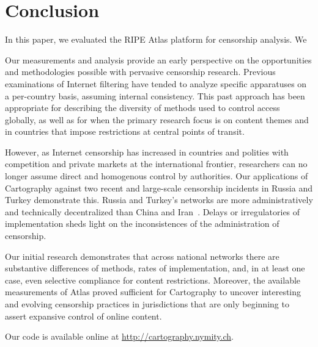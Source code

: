 \section{Conclusion}
\label{sec:conclusion}

In this paper, we evaluated the RIPE Atlas platform for censorship analysis.
We

Our measurements and analysis provide an early perspective on the opportunities
and methodologies possible with pervasive censorship research. Previous
examinations of Internet filtering have tended to analyze specific apparatuses
on a per-country basis, assuming internal consistency. This past approach has
been appropriate for describing the diversity of methods used to control access
globally, as well as for when the primary research focus is on content themes
and in countries that impose restrictions at central points of transit. 

However, as Internet censorship has increased in countries and polities with
competition and private markets at the international frontier, researchers can
no longer assume direct and homogenous control by authorities. Our applications
of Cartography against two recent and large-scale censorship incidents in
Russia and Turkey demonstrate this. Russia and Turkey's networks are more
administratively and technically decentralized than China and
Iran~\cite{Roberts2011}. Delays or irregulatories of implementation sheds light
on the inconsistences of the administration of censorship. 

Our initial research demonstrates that across national networks there are
substantive differences of methods, rates of implementation, and, in at least
one case, even selective compliance for content restrictions. Moreover, the
available measurements of Atlas proved sufficient for Cartography to uncover
interesting and evolving censorship practices in jurisdictions that are only
beginning to assert expansive control of online content.

Our code is available online at \url{http://cartography.nymity.ch}.
